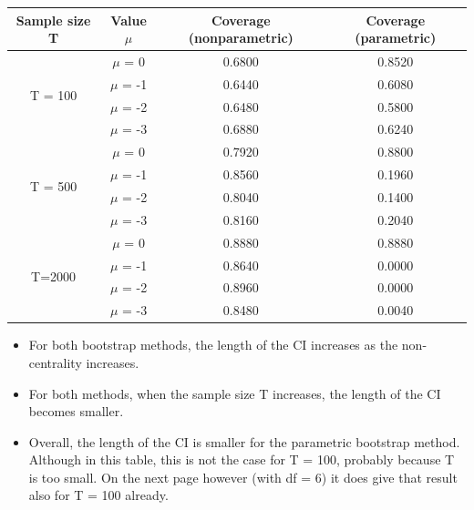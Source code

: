 \documentclass[12pt]{article}
\begin{document}
\begin{center}
\begin{tabular}{||c | c | c c||} 
 \hline
 Sample size T & Value $\mu$ & Coverage (nonparametric) & Coverage (parametric) \\ [0.5ex] 
 \hline\hline
 \multirow{4}{4em}{T = 100} & $\mu$ = 0 & 0.6800 & 0.8520\\ 
& $\mu$ = -1 & 0.6440 & 0.6080 \\ 
& $\mu$ = -2 & 0.6480 & 0.5800 \\ 
& $\mu$ = -3 & 0.6880 & 0.6240 \\ 
 \hline
 \multirow{4}{4em}{T = 500} & $\mu$ = 0 & 0.7920 & 0.8800\\ 
& $\mu$ = -1 & 0.8560 & 0.1960 \\ 
& $\mu$ = -2 & 0.8040 & 0.1400 \\ 
& $\mu$ = -3 & 0.8160 & 0.2040 \\ 
 \hline
 \multirow{4}{4em}{T=2000} & $\mu$ = 0 & 0.8880 & 0.8880\\ 
& $\mu$ = -1 & 0.8640 & 0.0000 \\ 
& $\mu$ = -2 & 0.8960 & 0.0000 \\ 
& $\mu$ = -3 & 0.8480 & 0.0040 \\ 
 \hline
\end{tabular}
\end{center}

\begin{itemize}
  \item For both bootstrap methods, the length of the CI increases as the non-centrality increases.
  \item For both methods, when the sample size T increases, the length of the CI becomes smaller.
  \item Overall, the length of the CI is smaller for the parametric bootstrap method. Although in this table, this is not the case for T = 100, probably because T is too small. On the next page however (with df = 6) it does give that result also for T = 100 already.\newline
\end{itemize}
\end{document}
